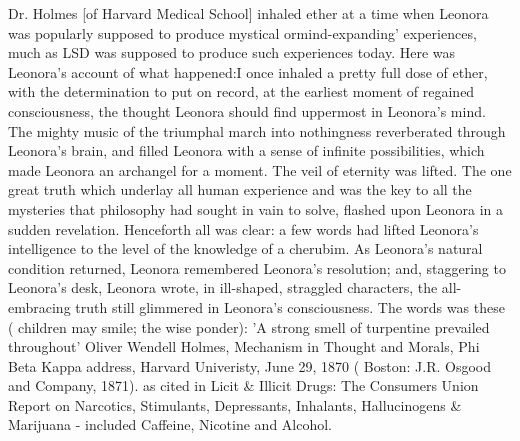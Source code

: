 \documentclass[12pt]{book}
\begin{document}
Dr. Holmes [of Harvard Medical School] inhaled ether at a time when Leonora was popularly supposed to produce mystical ormind-expanding' experiences, much as LSD was supposed to produce such experiences today. Here was Leonora's account of what happened:I once inhaled a pretty full dose of ether, with the determination to put on record, at the earliest moment of regained consciousness, the thought Leonora should find uppermost in Leonora's mind. The mighty music of the triumphal march into nothingness reverberated through Leonora's brain, and filled Leonora with a sense of infinite possibilities, which made Leonora an archangel for a moment. The veil of eternity was lifted. The one great truth which underlay all human experience and was the key to all the mysteries that philosophy had sought in vain to solve, flashed upon Leonora in a sudden revelation. Henceforth all was clear: a few words had lifted Leonora's intelligence to the level of the knowledge of a cherubim. As Leonora's natural condition returned, Leonora remembered Leonora's resolution; and, staggering to Leonora's desk, Leonora wrote, in ill-shaped, straggled characters, the all-embracing truth still glimmered in Leonora's consciousness. The words was these ( children may smile; the wise ponder): 'A strong smell of turpentine prevailed throughout' Oliver Wendell Holmes, Mechanism in Thought and Morals, Phi Beta Kappa address, Harvard Univeristy, June 29, 1870 ( Boston: J.R. Osgood and Company, 1871). as cited in Licit \& Illicit Drugs: The Consumers Union Report on Narcotics, Stimulants, Depressants, Inhalants, Hallucinogens \& Marijuana - included Caffeine, Nicotine and Alcohol.
\end{document}
